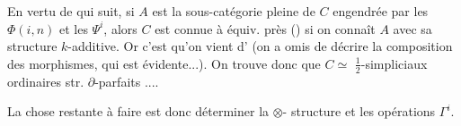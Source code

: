 En vertu de  qui suit,
si $A$ est la sous-catégorie pleine
de $C$ engendrée par les $\Phi(i,n)$
et les $\Psi^i$, alors $C$ est connue
à équiv. près ()
si on connaît $A$ avec sa structure
$k$-additive. Or c'est  qu'on vient
d' (on a omis
de décrire la composition des
morphismes, qui est évidente...).
On trouve donc que $C\simeq$
 $\frac12$-simpliciaux ordinaires
str. $\partial$-parfaits ....

La chose restante à faire
est donc déterminer la $\otimes$-
structure et les opérations $\Gamma^i$.
